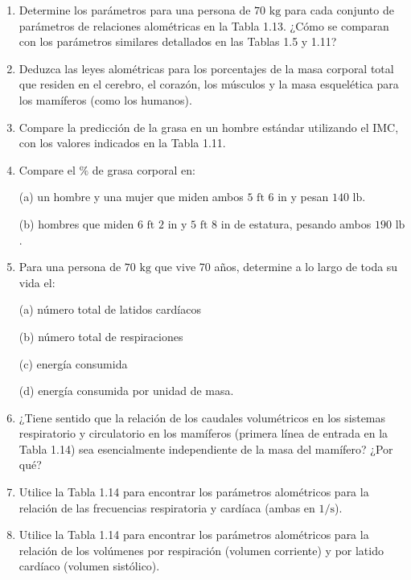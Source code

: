 \documentclass[12pt]{book}
\begin{document}
\begin{enumerate}
\subsection*{Alometría y escalado}

\item[1.49] Determine los parámetros para una persona de $70\text{ kg}$ para cada conjunto de parámetros de relaciones alométricas en la Tabla 1.13. ¿Cómo se comparan con los parámetros similares detallados en las Tablas 1.5 y 1.11?

\item[1.50] Deduzca las leyes alométricas para los porcentajes de la masa corporal total que residen en el cerebro, el corazón, los músculos y la masa esquelética para los mamíferos (como los humanos).

\item[1.51] Compare la predicción de la grasa en un hombre estándar utilizando el IMC, con los valores indicados en la Tabla 1.11.

\item[1.52] Compare el $\%$ de grasa corporal en:
  
  (a) un hombre y una mujer que miden ambos $5\text{ ft } 6\text{ in}$ y pesan $140\text{ lb}$.
  
  (b) hombres que miden $6\text{ ft } 2\text{ in}$ y $5\text{ ft } 8\text{ in}$ de estatura, pesando ambos $190\text{ lb}$.

\item[1.53] Para una persona de $70\text{ kg}$ que vive 70 años, determine a lo largo de toda su vida el:
  
  (a) número total de latidos cardíacos
  
  (b) número total de respiraciones
  
  (c) energía consumida
  
  (d) energía consumida por unidad de masa.

\item[1.54] ¿Tiene sentido que la relación de los caudales volumétricos en los sistemas respiratorio y circulatorio en los mamíferos (primera línea de entrada en la Tabla 1.14) sea esencialmente independiente de la masa del mamífero? ¿Por qué?

\item[1.55] Utilice la Tabla 1.14 para encontrar los parámetros alométricos para la relación de las frecuencias respiratoria y cardíaca (ambas en $1/\text{s}$).

\item[1.56] Utilice la Tabla 1.14 para encontrar los parámetros alométricos para la relación de los volúmenes por respiración (volumen corriente) y por latido cardíaco (volumen sistólico).


\end{enumerate}
\end{document}
